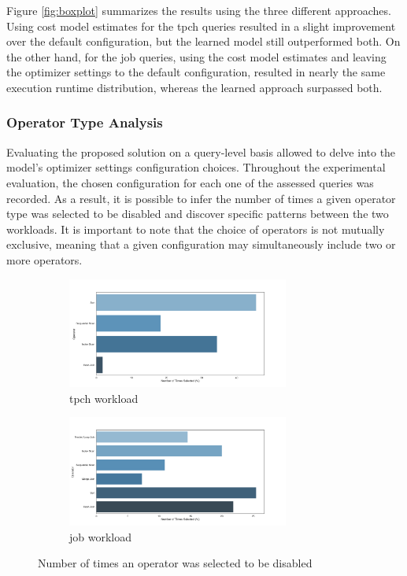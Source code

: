 Figure \ref{fig:boxplot} summarizes the results using the three different approaches. Using cost model estimates for the \gls{tpch} queries resulted in a slight improvement over the default configuration, but the learned model still outperformed both. On the other hand, for the \gls{job} queries, using the cost model estimates and leaving the optimizer settings to the default configuration, resulted in nearly the same execution runtime distribution, whereas the learned approach surpassed both.

\subsubsection{Operator Type Analysis}

Evaluating the proposed solution on a query-level basis allowed to delve into the model's optimizer settings configuration choices. Throughout the experimental evaluation, the chosen configuration for each one of the assessed queries was recorded. As a result, it is possible to infer the number of times a given operator type was selected to be disabled and discover specific patterns between the two workloads. It is important to note that the choice of operators is not mutually exclusive, meaning that a given configuration may simultaneously include two or more operators.

\begin{figure}[H]
\begin{subfigure}[t]{\textwidth}
    \centering
    \includegraphics[width=0.8\textwidth]{img/performance_evaluation/tpch_operator_analysis.png}
    \caption{\gls{tpch} workload}
    \label{fig:tpch_operator_analysis}
\end{subfigure}
\begin{subfigure}[t]{\textwidth}
    \centering
    \includegraphics[width=0.8\textwidth]{img/performance_evaluation/job_operator_analysis.png}
    \caption{\gls{job} workload}
    \label{fig:job_operator_analysis}
\end{subfigure}
\caption{Number of times an operator was selected to be disabled}

\end{figure}

